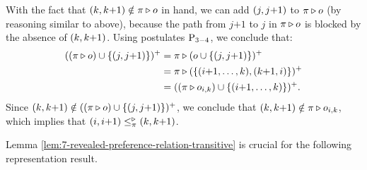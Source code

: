 \begin{prf*}{}{}
	With the fact that $({k},{k}{+}{1})\notin\pi\triangleright o$ in hand, 
	we can add $({j},{j}{+}{1})$ to $\pi\triangleright o$ (by reasoning similar to above),
	because the path from $j{+1}$ to $j$ in $\pi\triangleright o$ is blocked by the absence of $({k},{k}{+}{1})$.
	Using postulates $\mathrm{P}_{3-4}$, we conclude that:
		\begin{align*}
			((\pi\triangleright o)\cup\{({j},{j}{+}{1})\})^+ &=\pi\triangleright(o\cup\{({j},{j}{+}{1})\})^+\\
			&= \pi\triangleright(\{(i{+}1,\dots,k),(k{+1},i)\})^+\\
			&=((\pi\triangleright o_{i,k})\cup\{(i{+}1,\dots,k)\})^+.
		\end{align*}
	Since $({k},{k}{+}{1})\notin((\pi\triangleright o)\cup\{({j},{j}{+}{1})\})^+$, we conclude that 
	$({k},{k}{+}{1})\notin\pi\triangleright o_{i,k}$,
	which implies that $({i},{i}{+}{1})\le^\triangleright_\pi({k},{k}{+}{1})$.
\end{prf*}

Lemma \ref{lem:7-revealed-preference-relation-transitive} 
is crucial for the following 
representation result.

